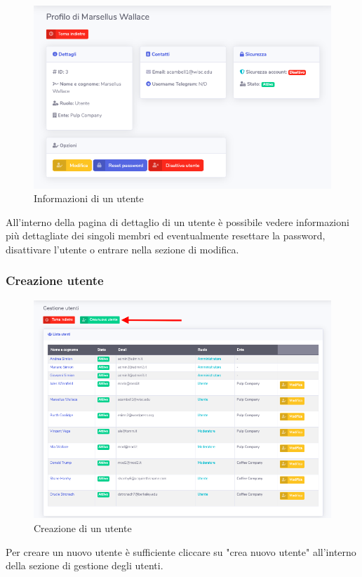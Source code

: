 		\begin{figure}[H]
		\centering
		\includegraphics[scale=0.600]{res/images/admin/dettUtente.png}
		\caption{Informazioni di un utente}
	\end{figure}
	All'interno della pagina di dettaglio di un utente è possibile vedere informazioni più dettagliate dei singoli membri ed eventualmente resettare la password, disattivare l'utente o entrare nella sezione di modifica.

	\subsubsection{Creazione utente}

		\begin{figure}[H]
		\centering
		\includegraphics[scale=0.600]{res/images/admin/selCreazUtente.png}
		\caption{Creazione di un utente}
	\end{figure}
	Per creare un nuovo utente è sufficiente cliccare su "crea nuovo utente" all'interno della sezione di gestione degli utenti.

